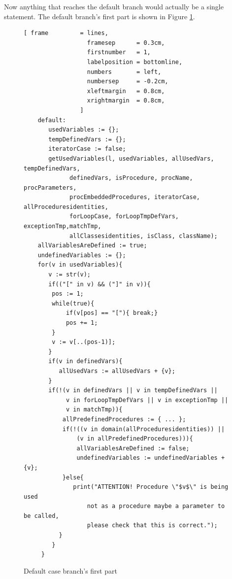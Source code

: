 \documentclass[11pt]{report}
\begin{document}
Now anything that reaches the default branch would actually be a single statement. The default branch's first part is shown in Figure \ref{fig:default case branch}.

\begin{figure}[!htb]
\centering
\begin{Verbatim}[ frame         = lines, 
                  framesep      = 0.3cm, 
                  firstnumber   = 1,
                  labelposition = bottomline,
                  numbers       = left,
                  numbersep     = -0.2cm,
                  xleftmargin   = 0.8cm,
                  xrightmargin  = 0.8cm,
                ]
    default:              
       usedVariables := {};
       tempDefinedVars := {};
       iteratorCase := false;
       getUsedVariables(l, usedVariables, allUsedVars, tempDefinedVars,
	         definedVars, isProcedure, procName, procParameters,
	         procEmbeddedProcedures, iteratorCase, allProceduresidentities, 
	         forLoopCase, forLoopTmpDefVars, exceptionTmp,matchTmp, 
	         allClassesidentities, isClass, className);
	allVariablesAreDefined := true;
	undefinedVariables := {};
	for(v in usedVariables){
	   v := str(v);
	   if(("[" in v) && ("]" in v)){
		pos := 1;
		while(true){
			if(v[pos] == "["){ break;}
			pos += 1;
		}
		v := v[..(pos-1)];
	   }
	   if(v in definedVars){
		  allUsedVars := allUsedVars + {v};
	   }
	   if(!(v in definedVars || v in tempDefinedVars || 
	        v in forLoopTmpDefVars || v in exceptionTmp ||
	        v in matchTmp)){
		   allPredefinedProcedures := { ... };
		   if(!((v in domain(allProceduresidentities)) ||
		       (v in allPredefinedProcedures))){
			   allVariablesAreDefined := false;
			   undefinedVariables := undefinedVariables + {v};
		   }else{
			  print("ATTENTION! Procedure \"$v$\" is being used 
			      not as a procedure maybe a parameter to be called,
			      please check that this is correct.");
		  }
	    }
	 }
\end{Verbatim}
\vspace*{-0.5cm}
\caption{Default case branch's first part}
\label{fig:default case branch}
\end{figure}
\end{document}
